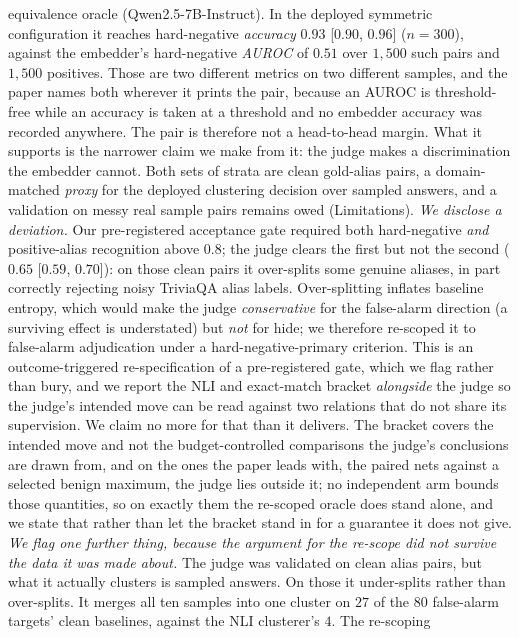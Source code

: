 equivalence oracle (Qwen2.5-7B-Instruct). In the deployed symmetric configuration it reaches
hard-negative \emph{accuracy} $0.93$ [$0.90$, $0.96$] ($n{=}300$), against the embedder's
hard-negative \emph{AUROC} of $0.51$ over $1{,}500$ such pairs and $1{,}500$ positives.
Those are two different metrics on two different
samples, and the paper names both wherever it prints the pair, because an AUROC is
threshold-free while an accuracy is taken at a threshold and no embedder accuracy was
recorded anywhere. The pair is therefore not a head-to-head margin. What it supports is the
narrower claim we make from it: the judge makes a discrimination the embedder cannot.
Both sets of strata are clean gold-alias
pairs, a domain-matched \emph{proxy} for the deployed clustering decision over sampled
answers, and a validation on messy real sample pairs remains owed (Limitations).
\emph{We disclose a deviation.} Our pre-registered
acceptance gate required both hard-negative \emph{and} positive-alias recognition above
$0.8$; the judge clears the first but not the second ($0.65$ [$0.59$, $0.70$]): on those
clean pairs it over-splits some genuine
aliases, in part correctly rejecting noisy TriviaQA alias labels. Over-splitting inflates
baseline entropy, which would make the judge \emph{conservative} for the false-alarm direction
(a surviving effect is understated) but \emph{not} for hide; we therefore re-scoped it to
false-alarm adjudication under a hard-negative-primary criterion. This is an
outcome-triggered re-specification of a pre-registered gate, which we flag rather than
bury, and we report the NLI and exact-match bracket \emph{alongside} the judge so the
judge's intended move can be read against two relations that do not share its supervision.
We claim no more for that than it delivers. The bracket covers the intended move and not the
budget-controlled comparisons the judge's conclusions are drawn from, and on the ones the
paper leads with, the paired nets against a selected benign maximum, the judge lies outside
it; no independent arm bounds those quantities, so on exactly them the
re-scoped oracle does stand alone, and we state that rather than let the bracket stand in
for a guarantee it does not give. \emph{We flag one further thing, because the
argument for the re-scope did not survive the data it was made about.} The judge was
validated on clean alias pairs, but what it actually clusters is sampled answers. On those it
under-splits rather than over-splits. It merges all ten samples into one cluster on $27$ of
the $80$ false-alarm targets' clean baselines, against the NLI clusterer's $4$. The re-scoping
